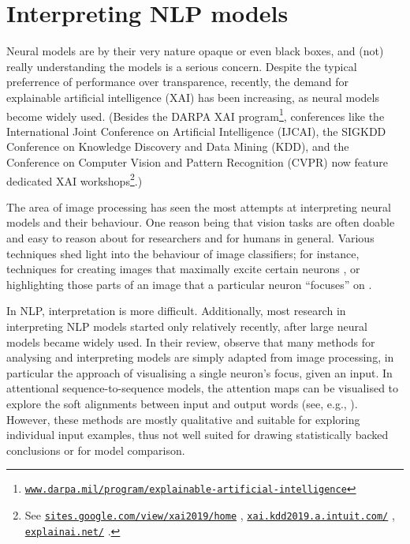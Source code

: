 \documentclass[bsc,frontabs,twoside,singlespacing,parskip,deptreport]{infthesis}
\newcommand\rurl[1]{%
  \href{https://#1}{\nolinkurl{#1}}%
}
\begin{document}
{  \section{Interpreting NLP models}{
    \label{sec:understanding-models}
    Neural models are by their very nature opaque or even black boxes, and (not) really understanding the models is a serious concern.
    Despite the typical preferrence of performance over transparence, recently, the demand for explainable artificial intelligence (XAI) has been increasing, as neural models become widely used. (Besides the DARPA XAI program\footnote{\rurl{www.darpa.mil/program/explainable-artificial-intelligence}}, conferences like the International Joint Conference on Artificial Intelligence (IJCAI), the SIGKDD Conference on Knowledge Discovery and Data Mining (KDD), and the Conference on Computer Vision and Pattern Recognition (CVPR) now feature dedicated XAI workshops\footnote{See \rurl{sites.google.com/view/xai2019/home}, \rurl{xai.kdd2019.a.intuit.com/}, \rurl{explainai.net/}.}.)

    The area of image processing has seen the most attempts at interpreting neural models and their behaviour. One reason being that vision tasks are often doable and easy to reason about for researchers and for humans in general. Various techniques shed light into the behaviour of image classifiers; for instance, techniques for creating images that maximally excite certain neurons \citep{Simonyan_2013}, or highlighting those parts of an image that a particular neuron ``focuses'' on \citep{Zeiler_2013}. 
    
    In NLP, interpretation is more difficult. Additionally, most research in interpreting NLP models started only relatively recently, after large neural models became widely used.
    In their review, \citet{Belinkov_2018} observe that many methods for analysing and interpreting models are simply adapted from image processing, in particular the approach of visualising a single neuron's focus, given an input.
    In attentional sequence-to-sequence models, the attention maps can be visualised to explore the soft alignments between input and output words (see, e.g., \citet{Strobelt_2018}). However, these methods are mostly qualitative and suitable for exploring individual input examples, thus not well suited for drawing statistically backed conclusions or for model comparison.
    
}}
\end{document}
